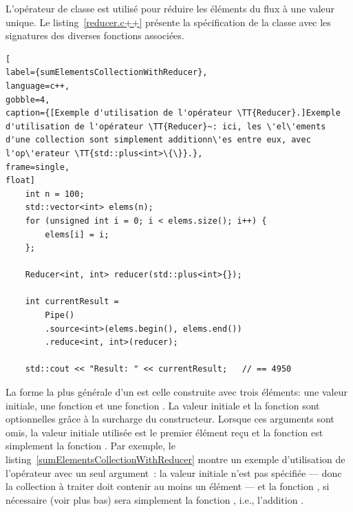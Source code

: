 
L'op\'erateur de classe  est utilis\'e pour r\'eduire les \'el\'ements du flux \`a une valeur unique. Le listing~\ref{reducer.c++} présente la spécification  de la classe  avec les signatures des diverses fonctions associées. 


\begin{lstlisting}[
label={sumElementsCollectionWithReducer},
language=c++,
gobble=4,
caption={[Exemple d'utilisation de l'opérateur \TT{Reducer}.]Exemple
d'utilisation de l'opérateur \TT{Reducer}~: ici, les \'el\'ements
d'une collection sont simplement additionn\'es entre eux, avec
l'op\'erateur \TT{std::plus<int>\{\}}.},
frame=single,
float]
    int n = 100;
    std::vector<int> elems(n);
    for (unsigned int i = 0; i < elems.size(); i++) {
        elems[i] = i;
    };

    Reducer<int, int> reducer(std::plus<int>{});

    int currentResult =
        Pipe()
        .source<int>(elems.begin(), elems.end())
        .reduce<int, int>(reducer);

	std::cout << "Result: " << currentResult;	// == 4950   
\end{lstlisting}



La forme la plus g\'en\'erale d'un  est celle construite avec trois \'el\'ements: une valeur initiale, une fonction  et une fonction . La valeur initiale et la fonction  sont optionnelles gr\^ace \`a la surcharge du constructeur. Lorsque ces arguments sont omis, la valeur initiale utilis\'ee est le premier \'el\'ement re\c{c}u et la fonction  est simplement la fonction . Par exemple, le listing~\ref{sumElementsCollectionWithReducer} montre un exemple d'utilisation de l'op\'erateur  avec un seul argument~: la valeur initiale n'est pas sp\'ecifi\'ee --- donc la collection \`a traiter doit contenir au moins un \'el\'ement --- et la fonction , si n\'ecessaire (voir plus bas) sera simplement la fonction , i.e., l'addition .


